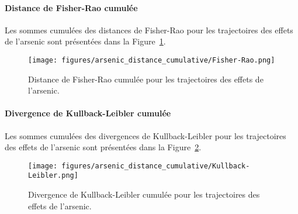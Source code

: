 \paragraph{Distance de Fisher-Rao cumulée}
Les sommes cumulées des distances de Fisher-Rao pour les trajectoires des effets de l'arsenic sont présentées dans la Figure~\ref{fig:arsenic_distance_cumulative-Fisher-Rao}.
\begin{figure}[H]
	\centering
	\texttt{[image: figures/arsenic\_distance\_cumulative/Fisher-Rao.png]}
	\caption{Distance de Fisher-Rao cumulée pour les trajectoires des effets de l'arsenic.}
	\label{fig:arsenic_distance_cumulative-Fisher-Rao}
\end{figure}

\paragraph{Divergence de Kullback-Leibler cumulée}
Les sommes cumulées des divergences de Kullback-Leibler pour les trajectoires des effets de l'arsenic sont présentées dans la Figure~\ref{fig:arsenic_distance_cumulative-Kullback-Leibler}.
\begin{figure}[H]
	\centering
	\texttt{[image: figures/arsenic\_distance\_cumulative/Kullback-Leibler.png]}
	\caption{Divergence de Kullback-Leibler cumulée pour les trajectoires des effets de l'arsenic.}
	\label{fig:arsenic_distance_cumulative-Kullback-Leibler}
\end{figure}